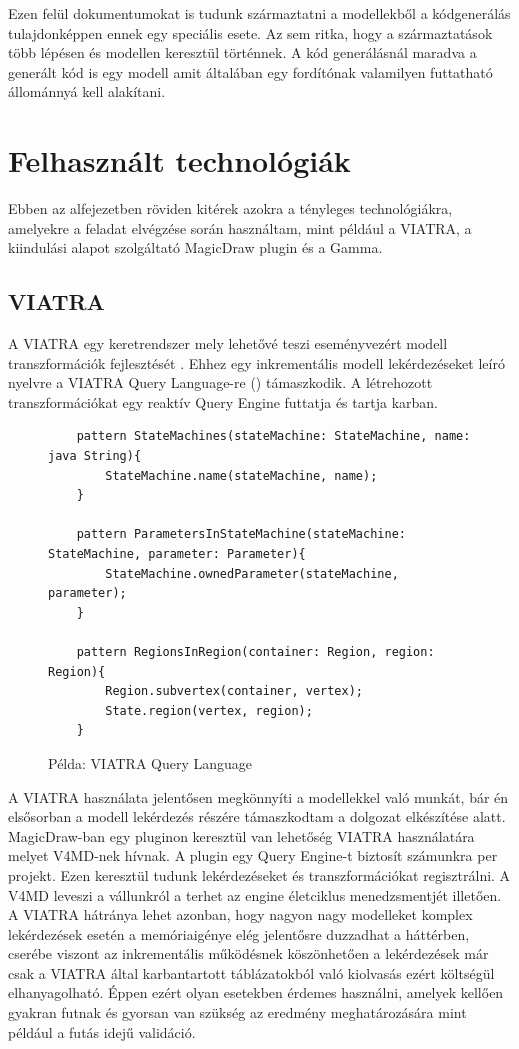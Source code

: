 Ezen felül dokumentumokat is tudunk származtatni a modellekből a kódgenerálás tulajdonképpen ennek egy speciális esete. Az sem ritka, hogy a származtatások több lépésen és modellen keresztül történnek. A kód generálásnál maradva a generált kód is egy modell amit általában egy fordítónak valamilyen futtatható állománnyá kell alakítani.


\section{Felhasznált technológiák}

Ebben az alfejezetben röviden kitérek azokra a tényleges  technológiákra, amelyekre a feladat elvégzése során használtam, mint például a VIATRA, a kiindulási alapot szolgáltató MagicDraw plugin és a Gamma.

\subsection[]{VIATRA\footnotemark}

A VIATRA egy keretrendszer mely lehetővé teszi eseményvezért modell transzformációk fejlesztését \cite{bergmann2015viatra}. Ehhez egy inkrementális modell lekérdezéseket leíró nyelvre a VIATRA Query Language-re () támaszkodik. A létrehozott transzformációkat egy reaktív Query Engine futtatja és tartja karban.

\begin{figure}[!ht]
	\begin{lstlisting}
	pattern StateMachines(stateMachine: StateMachine, name: java String){
	    StateMachine.name(stateMachine, name);
	}
	
	pattern ParametersInStateMachine(stateMachine: StateMachine, parameter: Parameter){
    	StateMachine.ownedParameter(stateMachine, parameter);
	}
	
	pattern RegionsInRegion(container: Region, region: Region){
	    Region.subvertex(container, vertex);
    	State.region(vertex, region);
	}
	\end{lstlisting}
	\caption{Példa: VIATRA Query Language}
	\label{fig:vql}
\end{figure}


A VIATRA használata jelentősen megkönnyíti a modellekkel való munkát, bár én elsősorban a modell lekérdezés részére támaszkodtam a dolgozat elkészítése alatt. MagicDraw-ban egy pluginon keresztül van lehetőség VIATRA használatára melyet V4MD-nek hívnak. A plugin egy Query Engine-t biztosít számunkra per projekt. Ezen keresztül tudunk lekérdezéseket és transzformációkat regisztrálni. A V4MD leveszi a vállunkról a terhet az engine életciklus menedzsmentjét illetően. A VIATRA hátránya lehet azonban, hogy nagyon nagy modelleket komplex lekérdezések esetén a memóriaigénye elég jelentősre duzzadhat a háttérben, cserébe viszont az inkrementális működésnek köszönhetően a lekérdezések már csak a VIATRA által karbantartott táblázatokból való kiolvasás ezért költségül elhanyagolható. Éppen ezért olyan esetekben érdemes használni, amelyek kellően gyakran futnak és gyorsan van szükség az eredmény meghatározására mint például a futás idejű validáció.

